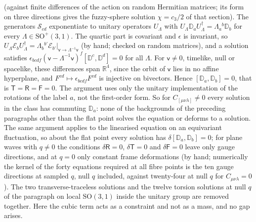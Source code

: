 (against finite differences of the action on random Hermitian matrices; its form on three directions gives the fuzzy-sphere solution \(\chi=c_3/2\) of that section). The generators \(\mathcal S_{cd}\) exponentiate to unitary operators \(U_\Lambda\) with \(U_\Lambda\mathbb D_aU_\Lambda^\dagger=\Lambda_a{}^b\mathbb D_b\) for every \(\Lambda\in\mathrm{SO}^+(3,1)\). The quartic part is covariant and \(\epsilon\) is invariant, so \(U_\Lambda\mathcal E_bU_\Lambda^\dagger=\Lambda_b{}^{b'}\mathcal E_{b'}|_{\mathsf v\to\Lambda^{-1}\mathsf v}\) (by hand; checked on random matrices), and a solution satisfies \(\epsilon_{bcdf}(\mathsf v-\Lambda^{-1}\mathsf v)^f[\mathbb D^c,\mathbb D^d]=0\) for all \(\Lambda\). For \(\mathsf v\neq0\), timelike, null or spacelike, these differences span \(\mathbb R^4\), since the orbit of \(\mathsf v\) lies in no affine hyperplane, and \(F^{cd}\mapsto\epsilon_{bcdf}F^{cd}\) is injective on bivectors. Hence \([\mathbb D_a,\mathbb D_b]=0\), that is \(\mathsf T=\mathsf R=\mathsf F=0\). The argument uses only the unitary implementation of the rotations of the label \(a\), not the first-order form. So for \(C_{[\mu\nu\lambda]}\neq0\) every solution in the class has commuting \(\mathbb D_a\): none of the backgrounds of the preceding paragraphs other than the flat point solves the equation or deforms to a solution. The same argument applies to the linearised equation on an equivariant fluctuation, so about the flat point every solution has \(\delta[\mathbb D_a,\mathbb D_b]=0\); for plane waves with \(q\neq0\) the conditions \(\delta\mathsf R=0\), \(\delta\mathsf T=0\) and \(\delta\mathsf F=0\) leave only gauge directions, and at \(q=0\) only constant frame deformations (by hand; numerically the kernel of the forty equations required at all fibre points is the ten gauge directions at sampled \(q\), null \(q\) included, against twenty-four at null \(q\) for \(C_{\mu\nu\lambda}=0\)). The two transverse-traceless solutions and the twelve torsion solutions at null \(q\) of the paragraph on local \(\mathrm{SO}(3,1)\) inside the unitary group are removed together. Here the cubic term acts as a constraint and not as a mass, and no gap arises.

